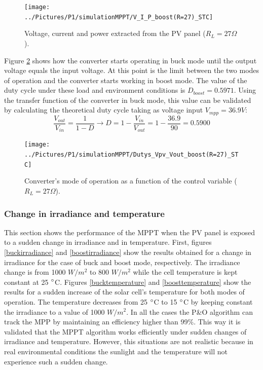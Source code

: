 \begin{figure}[H]
	\begin{center}
		\texttt{[image: ../Pictures/P1/simulationMPPT/V\_I\_P\_boost(R=27)\_STC]}
		\caption{Voltage, current and power extracted from the PV panel ($R_{L}=27\Omega$).}
		\label{boostSTC} 
	\end{center}	
\end{figure}

Figure \ref{boostSTC_duty} shows how the converter starts operating in buck mode until the output voltage equals the input voltage. At this point is the limit between the two modes of operation and the converter starts working in boost mode. The value of the duty cycle under these load and environment conditions is $D_{boost}= 0.5971$. Using the transfer function of the converter in  buck mode, this value can be validated by calculating the theoretical duty cycle taking as voltage input $V_{mpp}=36.9 V$: 
\begin{equation}
\frac{V_{out}}{V_{in}}= \frac{1}{1-D} \rightarrow D = 1 - \frac{V_{in}}{V_{out}} = 1 - \frac{36.9}{90} = 0.5900
\end{equation}
 
\begin{figure}[H]
	\begin{center}
		\texttt{[image: ../Pictures/P1/simulationMPPT/Dutys\_Vpv\_Vout\_boost(R=27)\_STC]}
		\caption{Converter's mode of operation as a function of the control variable ($R_{L}=27\Omega$).}
		\label{boostSTC_duty} 
	\end{center}	
\end{figure}


\subsubsection*{Change in irradiance and temperature}

This section shows the performance of the MPPT when the PV panel is exposed to a sudden change in irradiance and in temperature. First, figures \ref{buckirradiance} and \ref{boostirradiance} show the results obtained for a change in irradiance for the case of buck and boost mode, respectively. The irradiance change is from 1000 $W/ m^2$ to 800 $W/ m^2$ while the cell temperature is kept constant at 25 $\dec$C. 
Figures \ref{bucktemperature} and \ref{boosttemperature}  show the results for a sudden increase of the solar cell's temperature for both modes of operation. The temperature decreases from 25 $\dec$C to 15 $\dec$C by keeping constant the irradiance to a value of 1000 $W/ m^2$. 
In all the cases the P\&O algorithm can track the MPP by maintaining an efficiency higher than 99\%. This way it is validated that the MPPT algorithm works efficiently under sudden changes of irradiance and temperature. However, this situations are not realistic because in real environmental conditions the sunlight and the temperature will not experience such a sudden change. 

